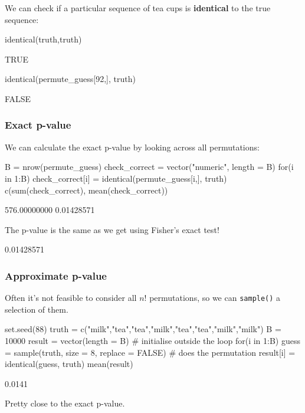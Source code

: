 \documentclass[a4paper]{article}
\begin{document}
	We can check if a particular sequence of tea cups is \textbf{identical} to the true sequence:
\begin{Schunk}
\begin{Sinput}
identical(truth,truth)
\end{Sinput}
\begin{Soutput}
[1] TRUE
\end{Soutput}
\begin{Sinput}
identical(permute_guess[92,], truth)
\end{Sinput}
\begin{Soutput}
[1] FALSE
\end{Soutput}
\end{Schunk}
\subsubsection{Exact p-value}
	We can calculate the exact p-value by looking across all permutations:
\begin{Schunk}
\begin{Sinput}
B = nrow(permute_guess)
check_correct = vector("numeric", length = B)
for(i in 1:B) {
  check_correct[i] = identical(permute_guess[i,], truth)
}
c(sum(check_correct), mean(check_correct))
\end{Sinput}
\begin{Soutput}
[1] 576.00000000   0.01428571
\end{Soutput}
\end{Schunk}
The p-value is the same as we get using Fisher's exact test!
\begin{Schunk}
\begin{Soutput}
[1] 0.01428571
\end{Soutput}
\end{Schunk}
\subsubsection{Approximate p-value}
Often it's not feasible to consider all \( n! \) permutations, so we can \lstinline|sample()| a selection of them.
\begin{Schunk}
\begin{Sinput}
set.seed(88)
truth = c("milk","tea","tea","milk","tea","tea","milk","milk")
B = 10000
result = vector(length = B) # initialise outside the loop
for(i in 1:B){
  guess = sample(truth, size = 8, replace = FALSE) # does the permutation
  result[i] = identical(guess, truth)
}
mean(result)
\end{Sinput}
\begin{Soutput}
[1] 0.0141
\end{Soutput}
\end{Schunk}
Pretty close to the exact p-value.
\end{document}
